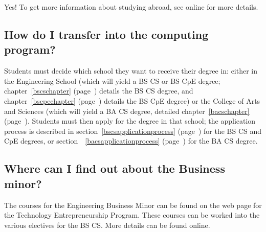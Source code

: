 Yes! To get more information about studying abroad, see
online
for more details.
 
\subsection{How do I transfer into the computing program?}

Students must decide which school they want to receive their degree
in: either in the Engineering School (which will yield a BS CS or BS
CpE degree; chapter~\ref{bscschapter} (page~\pageref{bscschapter})
details the BS CS degree, and chapter~\ref{bscpechapter}
(page~\pageref{bscpechapter}) details the BS CpE degree) or the
College of Arts and Sciences (which will yield a BA CS degree,
detailed chapter~\ref{bacschapter} (page~\pageref{bacschapter}).
Students must then apply for the degree in that school; the
application process is described in
section~\ref{bscsapplicationprocess}
(page~\pageref{bscsapplicationprocess}) for the BS CS and CpE degrees,
or section~~\ref{bacsapplicationprocess}
(page~\pageref{bacsapplicationprocess}) for the BA CS degree.

%


\subsection{Where can I find out about the Business minor?}

The courses for the Engineering Business Minor can be found on the web
page for the Technology Entrepreneurship Program.  These courses can
be worked into the various electives for the BS CS. More details can
be found online.


